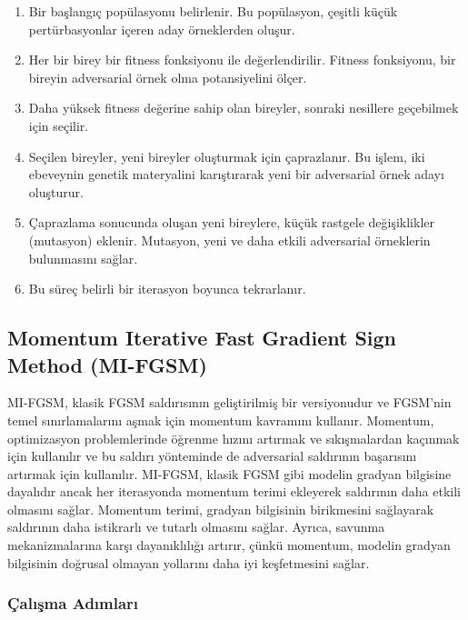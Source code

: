 \begin{enumerate}
    \item Bir başlangıç popülasyonu belirlenir. Bu popülasyon, çeşitli küçük pertürbasyonlar içeren aday örneklerden oluşur.
    \item Her bir birey bir fitness fonksiyonu ile değerlendirilir. Fitness fonksiyonu, bir bireyin adversarial örnek olma potansiyelini ölçer.
    \item Daha yüksek fitness değerine sahip olan bireyler, sonraki nesillere geçebilmek için seçilir.
    \item Seçilen bireyler, yeni bireyler oluşturmak için çaprazlanır. Bu işlem, iki ebeveynin genetik materyalini karıştırarak yeni bir adversarial örnek adayı oluşturur.
    \item Çaprazlama sonucunda oluşan yeni bireylere, küçük rastgele değişiklikler (mutasyon) eklenir. Mutasyon, yeni ve daha etkili adversarial örneklerin bulunmasını sağlar.
    \item Bu süreç belirli bir iterasyon boyunca tekrarlanır.
\end{enumerate}

\newpage

\subsection{Momentum Iterative Fast Gradient Sign Method (MI-FGSM)}

MI-FGSM, klasik FGSM saldırısının geliştirilmiş bir versiyonudur ve FGSM'nin temel sınırlamalarını aşmak için momentum kavramını kullanır. Momentum, optimizasyon problemlerinde öğrenme hızını artırmak ve sıkışmalardan kaçınmak için kullanılır ve bu saldırı yönteminde de adversarial saldırının başarısını artırmak için kullanılır. MI-FGSM, klasik FGSM gibi modelin gradyan bilgisine dayalıdır ancak her iterasyonda momentum terimi ekleyerek saldırının daha etkili olmasını sağlar. Momentum terimi, gradyan bilgisinin birikmesini sağlayarak saldırının daha istikrarlı ve tutarlı olmasını sağlar. Ayrıca, savunma mekanizmalarına karşı dayanıklılığı artırır, çünkü momentum, modelin gradyan bilgisinin doğrusal olmayan yollarını daha iyi keşfetmesini sağlar.

\subsubsection{Çalışma Adımları}

